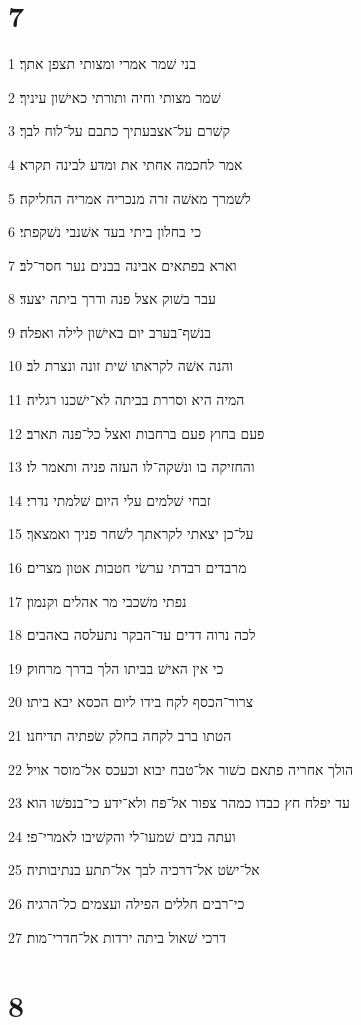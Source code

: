 \chapter{7}

\par 1 בני שׁמר אמרי ומצותי תצפן אתך׃
\par 2 שׁמר מצותי וחיה ותורתי כאישׁון עיניך׃
\par 3 קשׁרם על־אצבעתיך כתבם על־לוח לבך׃
\par 4 אמר לחכמה אחתי את ומדע לבינה תקרא׃
\par 5 לשׁמרך מאשׁה זרה מנכריה אמריה החליקה׃
\par 6 כי בחלון ביתי בעד אשׁנבי נשׁקפתי׃
\par 7 וארא בפתאים אבינה בבנים נער חסר־לב׃
\par 8 עבר בשׁוק אצל פנה ודרך ביתה יצעד׃
\par 9 בנשׁף־בערב יום באישׁון לילה ואפלה׃
\par 10 והנה אשׁה לקראתו שׁית זונה ונצרת לב׃
\par 11 המיה היא וסררת בביתה לא־ישׁכנו רגליה׃
\par 12 פעם בחוץ פעם ברחבות ואצל כל־פנה תארב׃
\par 13 והחזיקה בו ונשׁקה־לו העזה פניה ותאמר לו׃
\par 14 זבחי שׁלמים עלי היום שׁלמתי נדרי׃
\par 15 על־כן יצאתי לקראתך לשׁחר פניך ואמצאך׃
\par 16 מרבדים רבדתי ערשׂי חטבות אטון מצרים׃
\par 17 נפתי משׁכבי מר אהלים וקנמון׃
\par 18 לכה נרוה דדים עד־הבקר נתעלסה באהבים׃
\par 19 כי אין האישׁ בביתו הלך בדרך מרחוק׃
\par 20 צרור־הכסף לקח בידו ליום הכסא יבא ביתו׃
\par 21 הטתו ברב לקחה בחלק שׂפתיה תדיחנו׃
\par 22 הולך אחריה פתאם כשׁור אל־טבח יבוא וכעכס אל־מוסר אויל׃
\par 23 עד יפלח חץ כבדו כמהר צפור אל־פח ולא־ידע כי־בנפשׁו הוא׃
\par 24 ועתה בנים שׁמעו־לי והקשׁיבו לאמרי־פי׃
\par 25 אל־ישׂט אל־דרכיה לבך אל־תתע בנתיבותיה׃
\par 26 כי־רבים חללים הפילה ועצמים כל־הרגיה׃
\par 27 דרכי שׁאול ביתה ירדות אל־חדרי־מות׃

\chapter{8}

